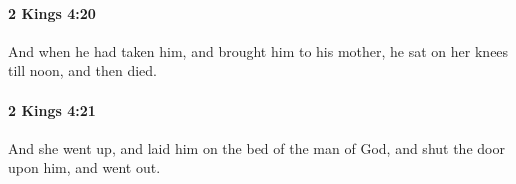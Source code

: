 		\paragraph{2 Kings 4:20} %
			\label{2KINGS-4-20}

			And when he had taken him, and brought him to his mother, he sat on her knees till noon, and then died.


		\paragraph{2 Kings 4:21} %
			\label{2KINGS-4-21}

			And she went up, and laid him on the bed of the man of God, and shut the door upon him, and went out.


